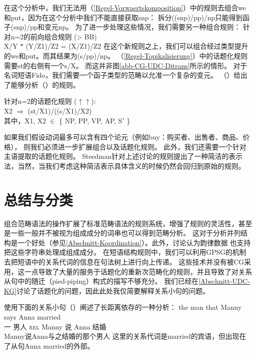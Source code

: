 在这个分析中，我们无法用（\ref{Regel-Vorwaertskomposition}）中的规则去组合we和put，因为在这个分析中我们不能直接获取s\bs np：
拆分((s\bs np)/pp)/np只能得到函子(s\bs np)/pp和变元np。
为了进一步处理这些情况，我们需要另一种组合规则：
\ea
针对n=2的前向组合规则 (> BB)\\
X/Y $*$ (Y/Z1)/Z2 = (X/Z1)/Z2
\z
在这个新规则之上，我们可以组合经过类型提升的we和put。而其结果为(s/pp)/np。
（\ref{Regel-Topikalisierung}）中的话题化规则需要st的右侧有一个s/X。
而这并非图\ref{abb-CG-UDC-Ditrans}所示的情形。
对于名词短语Fido，我们需要一个函子类型的范畴以允准一个复杂的变元。
（）给出了能够分析（）的规则。

\ea
\label{Regel-Topikalisierung-zwei}
针对n=2的话题化规则
 ($\uparrow\uparrow$\isc{$\uparrow\uparrow$}\is{$\uparrow\uparrow$}):\\
X2 $\Rightarrow$ (st/X1)/((s/X1)/X2)\\
其中，X1, X2 $\in$ \{ NP, PP, VP, AP, S$'$ \}
\z

\noindent
如果我们假设动词最多可以含有四个论元（例如buy：购买者、出售者、商品、价格），
则我们必须进一步扩展组合以及话题化规则。
此外，我们还需要一个针对主语提取的话题化规则\citep[]{Pollard88a}。
Steedman针对上述讨论的规则提出了一种简洁的表示法，当然，当我们考虑这种简洁表示具体含义的时候仍然会回归到原始的规则。 

\section{总结与分类}
\label{Abschnitt-Relativsaetze-CG}\label{Abschnitt-Ratte-CG}\label{sec-pied-piping-cg}

组合范畴语法的操作扩展了标准范畴语法的规则系统，增强了规则的灵活性，甚至是一些一般并不被视为组成成分的词串也可以得到范畴分析。
这对于分析并列结构是一个好处（参见\ref{Abschnitt-Koordination}）。此外，\citet{Steedman91a}讨论认为韵律数据
也支持把这些字符串处理成组成成分。
在短语结构规则中，我们可以利用GPSG的机制去把短语中的关系代词的信息在句法树上进行向上传递。
这些技术并没有被CG采用，这一点导致了大量的服务于话题化的重新次范畴化的规则，并且导致了对关系从句中的随迁（pied-piping）构式的描写不够充分。
我们已经在\ref{Abschnitt-UDC-KG}讨论了话题化的问题，因此此处我仅简要解释关系小句的问题。

\citet[]{SB2006a-u}使用下面的关系小句（）阐述了长距离依存的一种分析：
\ea
\gll the man  that Manny says Anna married \\
     一 男人 \textsc{rel} Manny 说 Anna 结婚 \\
\glt Manny说Anna与之结婚的那个男人
\z
这里的关系代词是married的宾语，但出现在了从句Anna married的外部。

